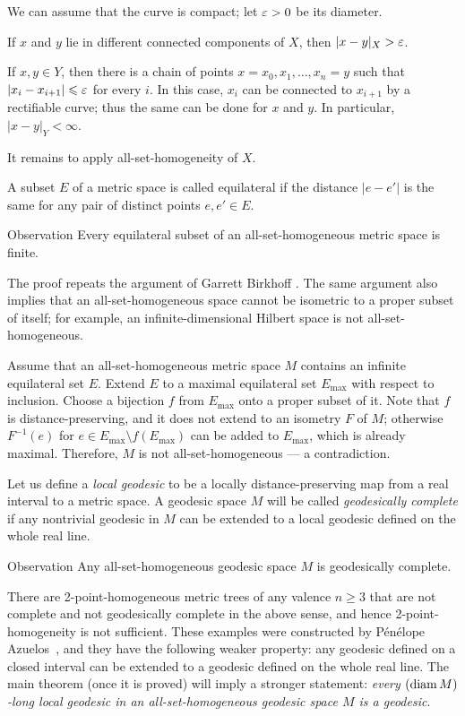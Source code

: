 \documentclass[a4paper,10pt]{article}
\begin{document}
We can assume that the curve is compact; let $\varepsilon>0$ be its diameter.

 If $x$ and $y$ lie in different connected components of $X$, then $|x-y|_X>\varepsilon$.

  If $x,y\in Y$,
then there is a chain of points $x=x_0,x_1,\ldots,x_n=y$ such that $|x_i-x_{i+1}|\leqslant\varepsilon$ for every $i$.
In this case, $x_i$ can be connected to $x_{i+1}$ by a rectifiable curve;
thus the same can be done for $x$ and $y$.
In particular, $|x-y|_Y<\infty$.

It remains to apply all-set-homogeneity of $X$.
\qeds

A subset $E$ of a metric space is called equilateral if the distance $|e-e'|$ is the same for any pair of distinct points $e,e'\in E$.

\begin{thm}{Observation}\label{obs:equilateral}
Every equilateral subset of an all-set-homogeneous metric space is finite.
\end{thm}

The proof repeats the argument of Garrett Birkhoff \cite[Theorem 18]{birkhoff}.
The same argument also implies that an all-set-homogeneous space cannot be isometric to a proper subset of itself; for example, an infinite-dimensional Hilbert space is not all-set-homogeneous.

Assume that an all-set-homogeneous metric space $M$ contains an infinite equilateral set $E$.
Extend $E$ to a maximal equilateral set $E_{\max}$ with respect to inclusion.
Choose a bijection $f$ from $E_{\max}$ onto a proper subset of it.
Note that $f$ is distance-preserving, and it does not extend to an isometry $F$ of $M$;
otherwise $F^{-1}(e)$ for $e\in E_{\max}\setminus f(E_{\max})$ can be added to $E_{\max}$, which is already maximal.
Therefore, $M$ is not all-set-homogeneous --- a contradiction.
\qeds

Let us define a \emph{local geodesic} to be a locally distance-preserving map from a real interval to a metric space.
A geodesic space $M$ will be called \emph{geodesically complete}
if any nontrivial geodesic in $M$ can be extended to a local geodesic defined on the whole real line.

\begin{thm}{Observation}\label{obs:geodesically-complete}
Any all-set-homogeneous geodesic space $M$ is geodesically complete.
\end{thm}

There are 2-point-homogeneous metric trees of any valence $n\geqslant 3$ that are not complete and not geodesically complete in the above sense, and hence 2-point-homogeneity is not sufficient.
These examples were constructed by Pénélope Azuelos~\cite{azuelos2025}, and they have the following weaker property: any geodesic defined on a closed interval can be extended to a geodesic defined on the whole real line.
The main theorem (once it is proved) will imply a stronger statement: \textit{every $(\mathop{\rm diam}\nolimits M)$-long local geodesic in an all-set-homogeneous geodesic space $M$ is a geodesic}.
\end{document}
